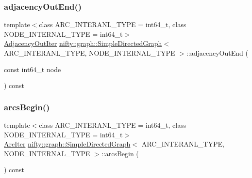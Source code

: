 \mbox{\label{classnifty_1_1graph_1_1SimpleDirectedGraph_a2131b4ec4ced8f0e3e9cee03baea6c55}} 
\subsubsection{\texorpdfstring{adjacency\+Out\+End()}{adjacencyOutEnd()}}
{\footnotesize\ttfamily template$<$class A\+R\+C\+\_\+\+I\+N\+T\+E\+R\+A\+N\+L\+\_\+\+T\+Y\+PE  = int64\+\_\+t, class N\+O\+D\+E\+\_\+\+I\+N\+T\+E\+R\+N\+A\+L\+\_\+\+T\+Y\+PE  = int64\+\_\+t$>$ \\
\hyperlink{classnifty_1_1graph_1_1SimpleDirectedGraph_a5af7a4eb6bbc44b805a44bb131786dd0}{Adjacency\+Out\+Iter} \hyperlink{classnifty_1_1graph_1_1SimpleDirectedGraph}{nifty\+::graph\+::\+Simple\+Directed\+Graph}$<$ A\+R\+C\+\_\+\+I\+N\+T\+E\+R\+A\+N\+L\+\_\+\+T\+Y\+PE, N\+O\+D\+E\+\_\+\+I\+N\+T\+E\+R\+N\+A\+L\+\_\+\+T\+Y\+PE $>$\+::adjacency\+Out\+End (\begin{DoxyParamCaption}\item[{const int64\+\_\+t}]{node }\end{DoxyParamCaption}) const\hspace{0.3cm}{\ttfamily [inline]}}

\mbox{\label{classnifty_1_1graph_1_1SimpleDirectedGraph_ae13330da1fe05b287535a037776e07c4}} 
\subsubsection{\texorpdfstring{arcs\+Begin()}{arcsBegin()}}
{\footnotesize\ttfamily template$<$class A\+R\+C\+\_\+\+I\+N\+T\+E\+R\+A\+N\+L\+\_\+\+T\+Y\+PE  = int64\+\_\+t, class N\+O\+D\+E\+\_\+\+I\+N\+T\+E\+R\+N\+A\+L\+\_\+\+T\+Y\+PE  = int64\+\_\+t$>$ \\
\hyperlink{classnifty_1_1graph_1_1SimpleDirectedGraph_ad555ff3a9746915c60858cd7d55ae342}{Arc\+Iter} \hyperlink{classnifty_1_1graph_1_1SimpleDirectedGraph}{nifty\+::graph\+::\+Simple\+Directed\+Graph}$<$ A\+R\+C\+\_\+\+I\+N\+T\+E\+R\+A\+N\+L\+\_\+\+T\+Y\+PE, N\+O\+D\+E\+\_\+\+I\+N\+T\+E\+R\+N\+A\+L\+\_\+\+T\+Y\+PE $>$\+::arcs\+Begin (\begin{DoxyParamCaption}{ }\end{DoxyParamCaption}) const\hspace{0.3cm}{\ttfamily [inline]}}

